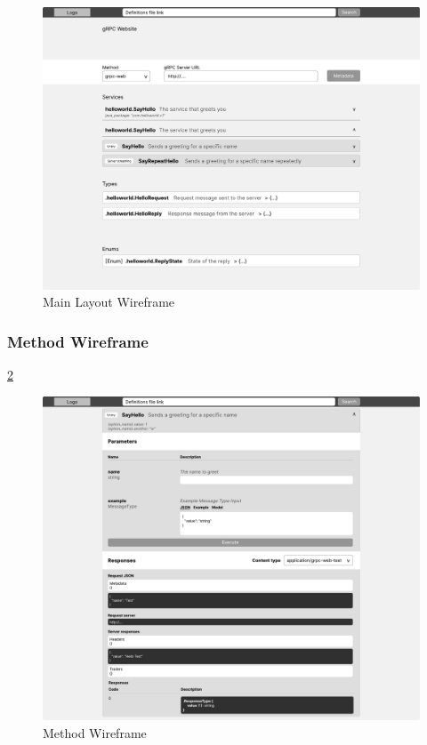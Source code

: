 \begin{figure}[hbt!]
    \centering
    \captionsetup{justification=centering}
    \includegraphics[width=1.0\textwidth]{images/design/wireframes/main-layout}
    \caption{Main Layout Wireframe}
    \label{fig:wireframe-main-layout}
\end{figure}

\subsubsection{Method Wireframe}
\ref{fig:wireframe-method}

\begin{figure}[hbt!]
    \centering
    \captionsetup{justification=centering}
    \includegraphics[width=1.0\textwidth]{images/design/wireframes/method}
    \caption{Method Wireframe}
    \label{fig:wireframe-method}
\end{figure}

